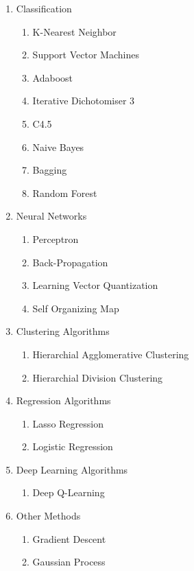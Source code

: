 \documentclass[a4paper]{article}
\begin{document}
\begin{enumerate}
\item Classification 
	\begin{enumerate}
	\item  K-Nearest Neighbor 
	\item Support Vector Machines
	\item Adaboost 
	\item Iterative Dichotomiser 3
	\item C4.5
	\item Naive Bayes
	\item  Bagging
	\item  Random Forest
	\end{enumerate}
 

	
	
\item Neural Networks
\begin{enumerate}
	\item Perceptron
	\item Back-Propagation
	\item Learning Vector Quantization
	\item Self Organizing Map
	
	
\end{enumerate}	

\item Clustering Algorithms
\begin{enumerate}
   \item Hierarchial Agglomerative Clustering
    \item Hierarchial Division Clustering
\end{enumerate}

\item Regression Algorithms
\begin{enumerate}
   \item Lasso Regression
   \item Logistic Regression
\end{enumerate}

\item Deep Learning Algorithms
\begin{enumerate}
   \item Deep Q-Learning 
\end{enumerate}


\item Other Methods
\begin{enumerate}
   \item Gradient Descent
   \item Gaussian Process
\end{enumerate}

\end{enumerate}
\end{document}
